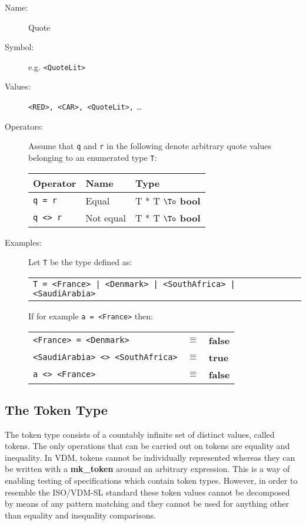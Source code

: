 \documentclass{overturerepchap}
\newcommand{\Index}[1]{#1\index{#1}}
\newcommand{\keyw}[1]{{\bf\ttfamily #1}}
\newcommand{\PROD}[2]{#1 * #2}
\newcommand{\TO}[2]{#1 $\To$ #2}
\begin{document}
\begin{description}
\item[Name:] \Index{Quote}
\item[Symbol:] e.g. {\tt <QuoteLit>}
\item[Values:] {\tt <RED>, <CAR>, <QuoteLit>,} \ldots
\item[Operators:] Assume that \texttt{q} and \texttt{r} in the
  following denote arbitrary quote values belonging to an enumerated
  type {\tt T}: 

  \begin{tabular}{|l|l|l|}\hline
    Operator     & Name      & Type \\ \hline
    {\tt q = r}  & Equal     & \TO{\PROD{T}{T}}{\keyw{bool}} \\
    {\tt q <> r} & Not equal & \TO{\PROD{T}{T}}{\keyw{bool}} \\
    \hline
  \end{tabular}%


\item[Examples:] Let \texttt{T} be the type defined as:

  \begin{tabular}{l}
    {\tt T = <France> | <Denmark> | <SouthAfrica> | <SaudiArabia>} \\
  \end{tabular}

  If for example {\tt a = <France>}
  then:

  \begin{tabular}{lcl}
     {\tt <France> = <Denmark>} & $\equiv$ & \keyw{false}\\
     {\tt <SaudiArabia> <> <SouthAfrica>} & $\equiv$ & \keyw{true}\\
     {\tt a <> <France>} & $\equiv$ & \keyw{false}
  \end{tabular}
\end{description}

\subsection{The Token Type}

The token type consists of a countably infinite set of distinct
values, called tokens. The only operations that can be carried out on
tokens are equality and inequality. In VDM,
tokens cannot be individually represented whereas they can be written
with a \keyw{mk\_token} around an arbitrary expression. This is a way
of enabling testing of specifications which contain token
types. However, in order to resemble the ISO/VDM-SL standard these token
values cannot be decomposed by means of any pattern matching and they
cannot be used for anything other than equality and inequality
comparisons.
\end{document}
